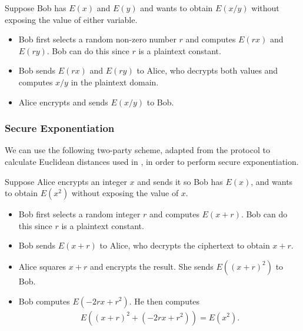 Suppose Bob has $E\left(x\right)$ and $E\left(y\right)$ and wants to obtain $E\left(x/y\right)$ without exposing the value of either variable.
\begin{itemize}
	\item Bob first selects a random non-zero number $r$ and computes $E\left(rx\right)$ and $E\left(ry\right)$. Bob can do this since $r$ is a plaintext constant.
	\item Bob sends $E\left(rx\right)$ and $E\left(ry\right)$ to Alice, who decrypts both values and computes $x/y$ in the plaintext domain.
	\item Alice encrypts and sends $E\left(x/y\right)$ to Bob.
\end{itemize}

\subsubsection{Secure Exponentiation}
\label{ssec:exponentiationprotocol}
 We can use the following two-party scheme, adapted from the protocol to calculate Euclidean distances used in \cite{hutchison_privacy-preserving_2009}, in order to perform secure exponentiation.

Suppose Alice encrypts an integer $x$ and sends it so Bob has $E\left(x\right)$, and wants to obtain $E\left(x^2\right)$ without exposing the value of $x$.
\begin{itemize}
	\item Bob first selects a random integer $r$ and computes $E\left(x+r\right)$. Bob can do this since $r$ is a plaintext constant.
	\item Bob sends $E\left(x+r\right)$ to Alice, who decrypts the ciphertext to obtain $x+r$.
	\item Alice squares $x+r$ and encrypts the result. She sends $E\left(\left(x+r\right)^2\right)$ to Bob.
	\item Bob computes $E\left(-2rx + r^2\right)$. He then computes
	\begin{align*}
		E\left(\left(x+r\right)^2+ \left(-2rx + r^2\right)\right) = E\left(x^2\right).
	\end{align*}
\end{itemize}

